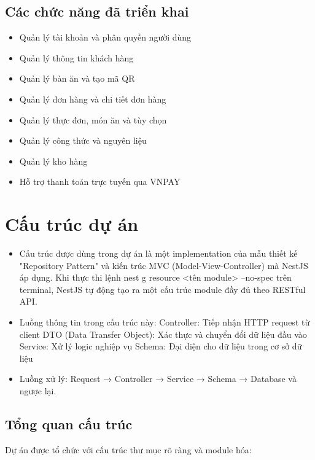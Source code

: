 \documentclass[a4paper]{article}
\begin{document}
\begin{itemize}
    \subsection{Các chức năng đã triển khai}
    \begin{itemize}
        \item Quản lý tài khoản và phân quyền người dùng
        \item Quản lý thông tin khách hàng
        \item Quản lý bàn ăn và tạo mã QR
        \item Quản lý đơn hàng và chi tiết đơn hàng
        \item Quản lý thực đơn, món ăn và tùy chọn
        \item Quản lý công thức và nguyên liệu
        \item Quản lý kho hàng
        \item Hỗ trợ thanh toán trực tuyến qua VNPAY
    \end{itemize}


\newpage
\section{Cấu trúc dự án}
\begin{itemize}
    \item Cấu trúc được dùng trong dự án là một implementation của mẫu thiết kế "Repository Pattern" và kiến trúc MVC (Model-View-Controller) mà NestJS áp dụng. Khi thực thi lệnh nest g resource <tên module> --no-spec trên terminal, NestJS tự động tạo ra một cấu trúc module đầy đủ theo RESTful API.
    \item Luồng thông tin trong cấu trúc này:
Controller: Tiếp nhận HTTP request từ client
DTO (Data Transfer Object): Xác thực và chuyển đổi dữ liệu đầu vào
Service: Xử lý logic nghiệp vụ
Schema: Đại diện cho dữ liệu trong cơ sở dữ liệu
    \item Luồng xử lý: Request → Controller → Service → Schema → Database và ngược lại.
\end{itemize}
\subsection{Tổng quan cấu trúc}

Dự án được tổ chức với cấu trúc thư mục rõ ràng và module hóa:


\end{itemize}
\end{document}
